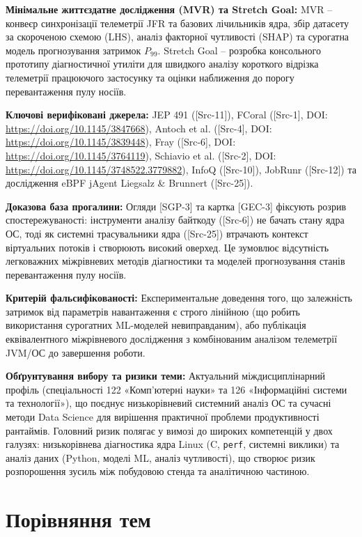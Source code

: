 \textbf{Мінімальне життєздатне дослідження (MVR) та Stretch Goal:} MVR -- конвеєр синхронізації телеметрії JFR та базових лічильників ядра, збір датасету за скороченою схемою (LHS), аналіз факторної чутливості (SHAP) та сурогатна модель прогнозування затримок $P_{99}$. Stretch Goal -- розробка консольного прототипу діагностичної утиліти для швидкого аналізу короткого відрізка телеметрії працюючого застосунку та оцінки наближення до порогу перевантаження пулу носіїв.

\textbf{Ключові верифіковані джерела:} JEP 491 ([Src-11]), FCoral ([Src-1], DOI: \url{https://doi.org/10.1145/3847668}), Antoch et al. ([Src-4], DOI: \url{https://doi.org/10.1145/3839448}), Fray ([Src-6], DOI: \url{https://doi.org/10.1145/3764119}), Schiavio et al. ([Src-2], DOI: \url{https://doi.org/10.1145/3748522.3779882}), InfoQ ([Src-10]), JobRunr ([Src-12]) та дослідження eBPF jAgent Liegsalz \& Brunnert ([Src-25]).

\textbf{Доказова база прогалини:} Огляди [SGP-3] та картка [GEC-3] фіксують розрив спостережуваності: інструменти аналізу байткоду ([Src-6]) не бачать стану ядра ОС, тоді як системні трасувальники ядра ([Src-25]) втрачають контекст віртуальних потоків і створюють високий оверхед. Це зумовлює відсутність легковажних міжрівневих методів діагностики та моделей прогнозування станів перевантаження пулу носіїв.

\textbf{Критерій фальсифікованості:} Експериментальне доведення того, що залежність затримок від параметрів навантаження є строго лінійною (що робить використання сурогатних ML-моделей невиправданим), або публікація еквівалентного міжрівневого дослідження з комбінованим аналізом телеметрії JVM/ОС до завершення роботи.

\textbf{Обґрунтування вибору та ризики теми:} Актуальний міждисциплінарний профіль (спеціальності 122 «Комп'ютерні науки» та 126 «Інформаційні системи та технології»), що поєднує низькорівневий системний аналіз ОС та сучасні методи Data Science для вирішення практичної проблеми продуктивності рантаймів. Головний ризик полягає у вимозі до широких компетенцій у двох галузях: низькорівнева діагностика ядра Linux (C, \texttt{perf}, системні виклики) та аналіз даних (Python, моделі ML, аналіз чутливості), що створює ризик розпорошення зусиль між побудовою стенда та аналітичною частиною.

\section{Порівняння тем}

